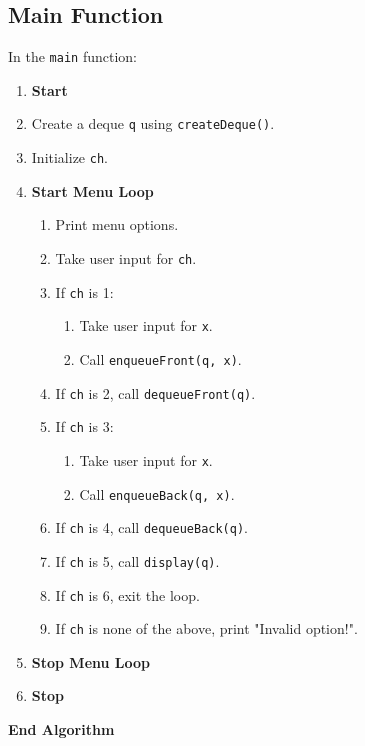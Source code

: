 {  \subsection{Main Function}
  In the \texttt{main} function:
  \begin{enumerate}[label=\arabic*:, start=1]
    \item \textbf{Start}
    \item Create a deque \texttt{q} using \texttt{createDeque()}.
    \item Initialize \texttt{ch}.
    \item \textbf{Start Menu Loop}
          \begin{enumerate}[label=4.\arabic*:, start=1]
            \item Print menu options.
            \item Take user input for \texttt{ch}.
            \item If \texttt{ch} is 1:
                  \begin{enumerate}[label=4.1.\arabic*:, start=1]
                    \item Take user input for \texttt{x}.
                    \item Call \texttt{enqueueFront(q, x)}.
                  \end{enumerate}
            \item If \texttt{ch} is 2, call \texttt{dequeueFront(q)}.
            \item If \texttt{ch} is 3:
                  \begin{enumerate}[label=4.1.\arabic*:, start=1]
                    \item Take user input for \texttt{x}.
                    \item Call \texttt{enqueueBack(q, x)}.
                  \end{enumerate}
            \item If \texttt{ch} is 4, call \texttt{dequeueBack(q)}.
            \item If \texttt{ch} is 5, call \texttt{display(q)}.
            \item If \texttt{ch} is 6, exit the loop.
            \item If \texttt{ch} is none of the above, print "Invalid option!".
          \end{enumerate}
    \item \textbf{Stop Menu Loop}
    \item \textbf{Stop}
  \end{enumerate}
  \textbf{End Algorithm}
 }

